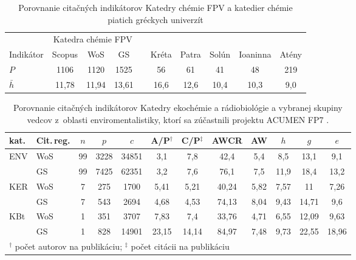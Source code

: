 \begin{table}
  \centering\small
  \caption[Porovnanie KCh FPV a chemických katedier vybraných gréckych univerzít]%
  {Porovnanie citačných indikátorov Katedry chémie FPV a katedier chémie piatich gréckych univerzít \citep{Lazaridis2010}}
  \label{tab:kazakis.results2}
  \begin{tabularx}{\textwidth}{Xccclccccc}
    \toprule\noalign{\vspace{.5ex}}
    & \multicolumn{3}{c}{Katedra chémie FPV} & \phantom{M} & \multicolumn{5}{c}{\citet{Kazakis2015}} \\
    \cmidrule{2-4}\cmidrule{5-9}
    Indikátor & Scopus & WoS & GS & & Kréta & Patra & Solún & Ioaninna & Atény \\[0.3ex]
    \midrule\noalign{\vspace{.5ex}}
    $P$       & 1106  & 1120  & 1525  & & 56   & 61   & 41   & 48   & 219 \\
    $\bar{h}$ & 11,78 & 11,94 & 13,61 & & 16,6 & 12,6 & 10,4 & 10,3 & 9,0 \\[0.5ex]
    \bottomrule
  \end{tabularx}
\end{table}

\begin{table}
  \centering\small
  \caption[Porovnanie KEB, KBt a vybranej skupiny enviromentalistov]%
  {Porovnanie citačných indikátorov Katedry ekochémie a rádiobiológie a vybranej skupiny vedcov z~oblasti enviromentalistiky, ktorí sa zúčastnili projektu ACUMEN FP7 \citep{Wildgaard2015}.}
  \label{tab:kazakis.results3}
  \begin{tabularx}{\textwidth}{Xlcccccccccc}
    \toprule\noalign{\vspace{.3ex}}
    kat. &Cit.\,reg. & $n$ & $p$ & $c$ & A/P$^\dagger$ & C/P$^\ddagger$ & AWCR & AW & $h$ & $g$ & $e$ \\[0.3ex]
    \midrule\noalign{\vspace{.5ex}}
    ENV & WoS & 99 & 3228 & 34851 & 3,1   & 7,8   & 42,4  & 5,4  & 8,5  & 13,1  & 9,1   \\
        & GS  & 99 & 7425 & 62351 & 3,2   & 7,6   & 76,1  & 7,5  & 11,9 & 18,4  & 13,2  \\[2ex]
    KER & WoS & 7  & 275  & 1700  & 5,41  & 5,21  & 40,24 & 5,82 & 7,57 & 11    & 7,26  \\
        & GS  & 7  & 543  & 2694  & 4,68  & 4,53  & 74,13 & 8,04 & 9,43 & 14,71 & 9,6   \\[2ex]
    KBt & WoS & 1  & 351  & 3707  & 7,83  & 7,4   & 33,76 & 4,71 & 6,55 & 12,09 & 9,63  \\
        & GS  & 1  & 828  & 14901 & 23,15 & 14,14 & 84,97 & 7,48 & 9,73 & 22,55 & 18,96 \\[0.5ex]
    \bottomrule
    \multicolumn{12}{l}{\footnotesize $^\dagger$ počet autorov na publikáciu; $^\ddagger$ počet citácii na publikáciu} \\
  \end{tabularx}
\end{table}

